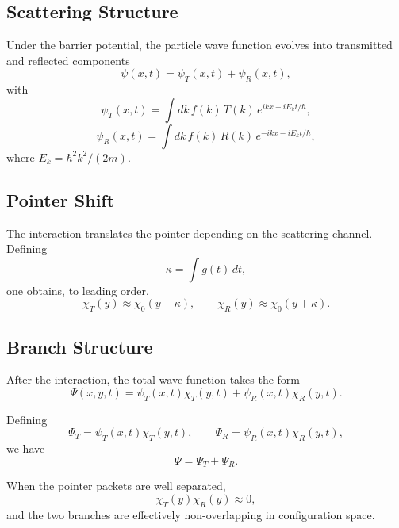 \subsection{Scattering Structure}

Under the barrier potential, the particle wave function evolves into transmitted and reflected components
\begin{equation}
\psi(x,t) = \psi_T(x,t) + \psi_R(x,t),
\end{equation}
with
\begin{equation}
\psi_T(x,t) = \int dk\, f(k)\,T(k)\,e^{ikx - iE_k t/\hbar},
\end{equation}
\begin{equation}
\psi_R(x,t) = \int dk\, f(k)\,R(k)\,e^{-ikx - iE_k t/\hbar},
\end{equation}
where $E_k = \hbar^2 k^2 / (2m)$.

\subsection{Pointer Shift}

The interaction translates the pointer depending on the scattering channel. Defining
\begin{equation}
\kappa = \int g(t)\,dt,
\end{equation}
one obtains, to leading order,
\begin{equation}
\chi_T(y) \approx \chi_0(y - \kappa), \qquad
\chi_R(y) \approx \chi_0(y + \kappa).
\end{equation}

\subsection{Branch Structure}

After the interaction, the total wave function takes the form
\begin{equation}
\Psi(x,y,t) =
\psi_T(x,t)\chi_T(y,t)
+
\psi_R(x,t)\chi_R(y,t).
\end{equation}

Defining
\begin{equation}
\Psi_T = \psi_T(x,t)\chi_T(y,t), \qquad
\Psi_R = \psi_R(x,t)\chi_R(y,t),
\end{equation}
we have
\begin{equation}
\Psi = \Psi_T + \Psi_R.
\end{equation}

When the pointer packets are well separated,
\begin{equation}
\chi_T(y)\chi_R(y) \approx 0,
\end{equation}
and the two branches are effectively non-overlapping in configuration space.


